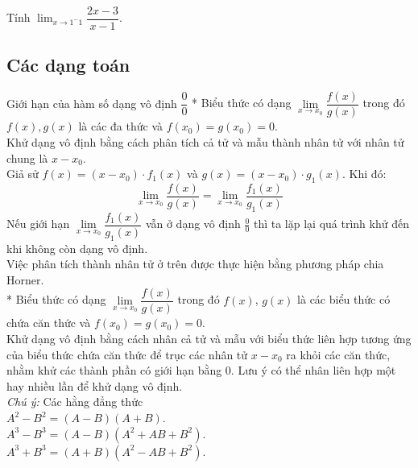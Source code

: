 \begin{vd}%
Tính $\displaystyle \lim_{x \to 1^-1}\dfrac{2x - 3}{x - 1}$.
\end{vd}
\subsection{Các dạng toán}
\begin{dang}{Giới hạn của hàm số dạng vô định $\dfrac{0}{0}$}
* Biểu thức có dạng $\lim\limits_{x\to x_0}\dfrac{f(x)}{g(x)}$ trong đó $f(x), g(x)$ là các đa thức và $f(x_0)=g(x_0)=0$.\\
Khử dạng vô định bằng cách phân tích cả tử và mẫu thành nhân tử với nhân tử chung là $x-x_0$.\\
Giả sử $f(x)=(x-x_0) \cdot f_1(x)$ và $g(x)=(x-x_0) \cdot g_1(x)$. Khi đó:
$$\lim\limits_{x\to x_0}\frac{f(x)}{g(x)}=\lim\limits_{x\to x_0}\frac{f_1(x)}{g_1(x)}$$
Nếu giới hạn $\lim\limits_{x\to x_0}\dfrac{f_1(x)}{g_1(x)}$ vẫn ở dạng vô định $\displaystyle\frac{0}{0}$ thì ta lặp lại quá trình khử đến khi không còn dạng vô định.\\
Việc phân tích thành nhân tử ở trên được thực hiện bằng phương pháp chia Horner.\\

* Biểu thức có dạng $\lim\limits_{x\to x_0}\dfrac{f(x)}{g(x)}$ trong đó $f(x)$, $g(x)$ là các biểu thức có chứa căn thức và $f(x_0)=g(x_0)=0$.\\
Khử dạng vô định bằng cách nhân cả tử và mẫu với biểu thức liên hợp tương ứng của biểu thức chứa căn thức để trục các nhân tử $x-x_0$ ra khỏi các căn thức, nhằm khử các thành phần có giới hạn bằng 0. Lưu ý có thể nhân liên hợp một hay nhiều lần để khử dạng vô định.\\
\textit{Chú ý:} Các hằng đẳng thức\\
\hspace{1.5cm} $A^2-B^2=(A-B)(A+B)$.\\
\hspace{1.5cm} $A^3-B^3=(A-B)(A^2+AB+B^2)$.\\
\hspace{1.5cm} $A^3+B^3=(A+B)(A^2-AB+B^2)$.
\end{dang}

